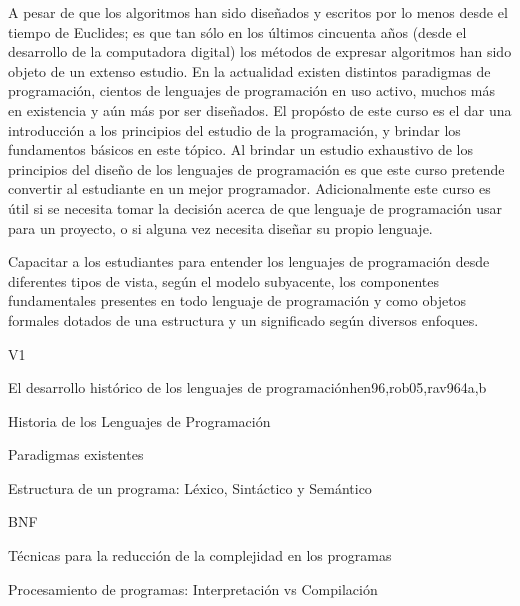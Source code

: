 \begin{syllabus}


\begin{justification}
A pesar de que los algoritmos han sido diseñados y escritos por lo menos
desde el tiempo de Euclides; es que tan sólo en los últimos cincuenta años
(desde el desarrollo de la computadora digital) los métodos de expresar
algoritmos han sido objeto de un extenso estudio. En la actualidad existen
distintos paradigmas de programación, cientos de lenguajes de programación
en uso activo, muchos más en existencia y aún más por ser diseñados.
El propósto de este curso es el dar una introducción a los principios del
estudio de la programación, y brindar los fundamentos básicos en este
tópico. Al brindar un estudio exhaustivo de los principios del diseño de los
lenguajes de programación es que este curso pretende convertir al estudiante
en un mejor programador. Adicionalmente este curso es útil si se necesita
tomar la decisión acerca de que lenguaje de programación usar para un
proyecto, o si alguna vez necesita diseñar su propio lenguaje.
\end{justification}

\begin{goals}
\item Capacitar a los estudiantes para entender los lenguajes de programación desde 
diferentes tipos de vista, según el modelo subyacente, los componentes fundamentales 
presentes en todo lenguaje de programación y como objetos formales dotados de una 
estructura y un significado según diversos enfoques.
\end{goals}

\begin{outcomes}{V1}
   \item {}
   \item {}
   \item {}
   \item {}
\end{outcomes}

\begin{unit}{El desarrollo histórico de los lenguajes de programación}{hen96,rob05,rav96}{4}{a,b}
\begin{topics}
      \item Historia de los Lenguajes de Programación
      \item Paradigmas existentes
      \item Estructura de un programa: Léxico, Sintáctico y Semántico
      \item BNF
      \item Técnicas para la reducción de la complejidad en los programas
      \item Procesamiento de programas: Interpretación vs Compilación
   \end{topics}


\end{unit}
\end{syllabus}
